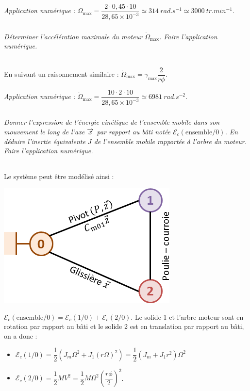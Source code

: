 \documentclass[10pt,fleqn]{article} %
\begin{document}
\begin{multicols}{2}
\begin{corrige}
\textit{Application numérique :} $\Omega_{\text{max}}=\dfrac{2\cdot 0,45 \cdot 10}{28,65\times 10^{-3}}\simeq\SI{314}{rad.s^{-1}}\simeq\SI{3000}{tr.min^{-1}}$.

\end{corrige}
\else
\fi

\subparagraph{}\textit{Déterminer l’accélération maximale du moteur $\dot{\Omega}_{\text{max}}$. Faire l’application numérique.}
\ifprof
\begin{corrige}~\\
En suivant un raisonnement similaire : 
$\dot{\Omega}_{\text{max}}=\gamma_{\text{max}}\dfrac{2}{r \phi}$. 


\textit{Application numérique : } $\dot{\Omega}_{\text{max}}=\dfrac{10\cdot 2\cdot 10}{ 28,65\times 10^{-3}}\simeq \SI{6981}{rad.s^{-2}}$. 


\end{corrige}
\else
\fi


\subparagraph{}\textit{Donner l’expression de l’énergie cinétique de l’ensemble mobile dans son mouvement le long de l’axe $\overrightarrow{x}$ par rapport au bâti notée $\mathcal{E}_c\left(\text{ensemble}/0\right)$. En déduire l’inertie équivalente $J$ de l’ensemble mobile rapportée à l’arbre du moteur. Faire l’application numérique.}
\ifprof
\begin{corrige}~\\
Le système peut être modélisé ainsi :

\begin{center}
\includegraphics[width=.7\linewidth]{images/cor_01}
\end{center}

$\mathcal{E}_c\left(\text{ensemble}/0\right) = \mathcal{E}_c\left(1/0\right)+\mathcal{E}_c\left(2/0\right)$. Le solide 1 et l'arbre moteur sont en rotation par rapport au bâti et le solide 2 est en translation par rapport au bâti, on a donc : 
\begin{itemize}
\item $\mathcal{E}_c\left(1/0\right) = \dfrac{1}{2}\left( J_m \Omega^2 + J_1 \left(r\Omega\right)^2\right)= \dfrac{1}{2}\left( J_m  + J_1 r^2\right)\Omega^2$
\item $\mathcal{E}_c\left(2/0\right) = \dfrac{1}{2} M V^2 = \dfrac{1}{2} M \Omega^2  \left(\dfrac{r\phi}{2}\right)^2$.
\end{itemize}


\end{corrige}
\end{multicols}
\end{document}
